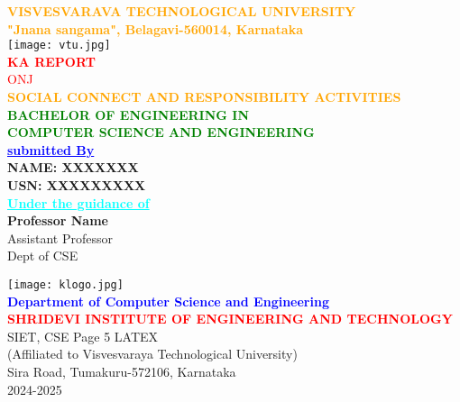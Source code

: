 \documentclass[12pt,a4paper]{article}
\begin{document}
\begin{center}
\textcolor{orange}{\large\textbf{VISVESVARAVA TECHNOLOGICAL UNIVERSITY\\
"Jnana sangama", Belagavi-560014, Karnataka}}\\
\vspace{2mm}
\texttt{[image: vtu.jpg]}\\
\vspace{2mm}
\textcolor{red}{\textbf{KA REPORT}}\\
\textcolor{red}{\tiny{ONJ}}\\
\vspace{2mm}
\textcolor{orange}{\textbf{SOCIAL CONNECT AND RESPONSIBILITY ACTIVITIES}}\\
\vspace{5mm}
\textcolor{green}{\textbf{BACHELOR OF ENGINEERING IN\\
COMPUTER SCIENCE AND ENGINEERING}}\\
\vspace{5mm}
\textcolor{blue}{\underline{\textbf{submitted By}}}\\
\textbf{NAME: XXXXXXX}\\
\textbf{USN: XXXXXXXXX}\\
\vspace{5mm}
\textcolor{cyan}{\underline{\textbf{Under the guidance of}}}\\
\large\textbf{Professor Name}\\
Assistant Professor\\
Dept of CSE\\
\end{center}

\begin{center}
\texttt{[image: klogo.jpg]}\\
\textcolor{blue}{\textbf{Department of Computer Science and Engineering}}\\
\textcolor{red}{\textbf{SHRIDEVI INSTITUTE OF ENGINEERING AND TECHNOLOGY}}\\
SIET, CSE Page 5 LATEX\\
(Affiliated to Visvesvaraya Technological University)\\
Sira Road, Tumakuru-572106, Karnataka\\
2024-2025
\end{center}

\end{document}
